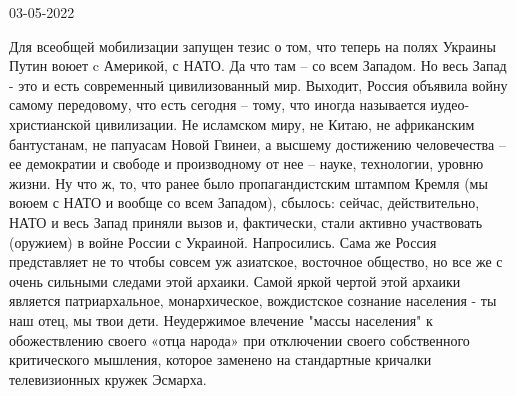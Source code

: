 03-05-2022 

Для всеобщей мобилизации запущен тезис о том,
что
теперь на полях Украины Путин воюет c Америкой, с НАТО. Да что
там – со
всем Западом. Но весь Запад - это и есть современный
цивилизованный мир.
Выходит, Россия объявила войну самому передовому, что есть
сегодня –
тому, что иногда называется иудео-христианской цивилизации. Не
исламском миру,
не Китаю, не африканским бантустанам, не папуасам Новой Гвинеи, а
высшему
достижению человечества – ее демократии и свободе и производному
от нее –
науке, технологии, уровню жизни. Ну что ж, то, что ранее было
пропагандистским штампом Кремля (мы воюем с НАТО и вообще со всем
Западом),
сбылось: сейчас, действительно, НАТО и весь Запад приняли вызов и,
фактически,
стали активно участвовать (оружием) в войне России с Украиной.
Напросились.
Сама же Россия представляет не то чтобы совсем уж азиатское,
восточное
общество, но все же с очень сильными следами этой архаики. Самой
яркой
чертой этой архаики является патриархальное, монархическое,
вождистское
сознание населения - ты наш отец, мы твои дети. Неудержимое
влечение
"массы населения" к обожествлению своего «отца народа» при
отключении
своего собственного критического мышления, которое заменено на
стандартные кричалки телевизионных кружек Эсмарха.
